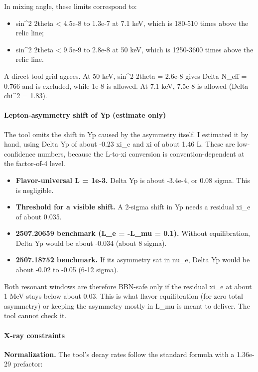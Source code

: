 \documentclass[11pt,a4paper]{article}
\begin{document}
In mixing angle, these limits correspond to:

\begin{itemize}
  \item sin\textasciicircum{}2 2theta \textless{} 4.5e-8 to 1.3e-7 at 7.1 keV, which is 180-510 times above the relic line;
  \item sin\textasciicircum{}2 2theta \textless{} 9.5e-9 to 2.8e-8 at 50 keV, which is 1250-3600 times above the relic line.
\end{itemize}
A direct tool grid agrees. At 50 keV, sin\textasciicircum{}2 2theta = 2.6e-8 gives Delta N\_eff = 0.766 and is excluded, while 1e-8 is allowed. At 7.1 keV, 7.5e-8 is allowed (Delta chi\textasciicircum{}2 = 1.83).

\paragraph{Lepton-asymmetry shift of Yp (estimate only)}
The tool omits the shift in Yp caused by the asymmetry itself. I estimated it by hand, using Delta Yp of about -0.23 xi\_e and xi of about 1.46 L. These are low-confidence numbers, because the L-to-xi conversion is convention-dependent at the factor-of-4 level.

\begin{itemize}
  \item \textbf{Flavor-universal L = 1e-3.} Delta Yp is about -3.4e-4, or 0.08 sigma. This is negligible.
  \item \textbf{Threshold for a visible shift.} A 2-sigma shift in Yp needs a residual xi\_e of about 0.035.
  \item \textbf{2507.20659 benchmark (L\_e = -L\_mu = 0.1).} Without equilibration, Delta Yp would be about -0.034 (about 8 sigma).
  \item \textbf{2507.18752 benchmark.} If its asymmetry sat in nu\_e, Delta Yp would be about -0.02 to -0.05 (6-12 sigma).
\end{itemize}
Both resonant windows are therefore BBN-safe only if the residual xi\_e at about 1 MeV stays below about 0.03. This is what flavor equilibration (for zero total asymmetry) or keeping the asymmetry mostly in L\_mu is meant to deliver. The tool cannot check it.

\paragraph{X-ray constraints}
\textbf{Normalization.} The tool's decay rates follow the standard formula with a 1.36e-29 prefactor:
\end{document}
